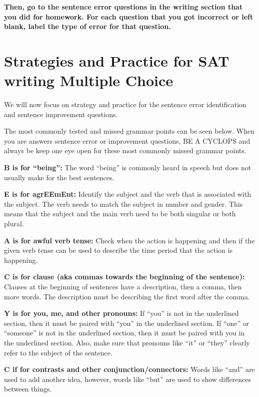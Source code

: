 \bigskip
\textbf{Then, go to the sentence error questions in the writing section that you did for homework. For each question that you got incorrect or left blank, label the type of error for that question.}

\vfill
\newpage

\section[Multiple Choice Strategies]{Strategies and Practice for SAT writing Multiple Choice}

We will now focus on strategy and practice for the sentence error identification and sentence improvement questions. 

\bigskip

The most commonly tested and missed grammar points can be seen below. When you are answers sentence error or improvement questions, BE A CYCLOPS and always be keep one eye open for these most commonly missed grammar points.

\bigskip
\textbf{B is for “being”:} The word “being” is commonly heard in speech but does not usually make for the best sentences.

\bigskip
\textbf{E is for agrEEmEnt:} Identify the subject and the verb that is associated with the subject. The verb needs to match the subject in number and gender. This means that the subject and the main verb need to be both singular or both plural. 

\bigskip

\bigskip
\textbf{A is for awful verb tense:} Check when the action is happening and then if the given verb tense can be used to describe the time period that the action is happening. 

\bigskip

\bigskip
\textbf{C is for clause (aka commas towards the beginning of the sentence):} Clauses at the beginning of sentences have a description, then a comma, then more words. The description must be describing the first word after the comma. 

\bigskip
\textbf{Y is for you, me, and other pronouns:} If “you” is not in the underlined section, then it must be paired with “you” in the underlined section. If “one” or “someone” is not in the underlined section, then it must be paired with you in the underlined section. Also, make sure that pronouns like “it” or “they” clearly refer to the subject of the sentence. 

\bigskip
\textbf{C if for contrasts and other conjunction/connectors:} Words like “and” are used to add another idea, however, words like “but” are used to show differences between things. 


